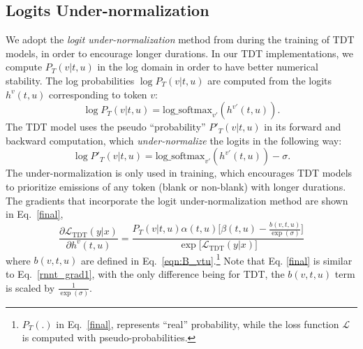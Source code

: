 \documentclass{article}
\begin{document}
\subsection{Logits Under-normalization} \label{sec:under_norm}
We adopt the \emph{logit under-normalization} method from \cite{xu2022multi} during the training of  TDT models, in order to encourage longer durations. 
In our TDT implementations, we compute $P_T(v|t, u)$  in the log domain in order to have better numerical stability. The log probabilities $\log P_T(v|t, u)$ are computed from the logits  $h^v(t,u)$ corresponding to token $v$:
\begin{equation}
    \log P_T(v|t, u) =
\text{log\_softmax}_{v'} (h^{v'}(t, u)).
\end{equation}
The TDT model uses the pseudo ``probability'' $P'_T(v|t,u)$  in its forward and backward computation, which \emph{under-normalize} the logits in the following way:
\begin{equation}
\label{logits}
\log P'_T(v|t, u) =
\text{log\_softmax}_{v'} (h^{v'}(t, u)) - \sigma.
\end{equation}
The under-normalization is only used in training, which encourages TDT models to prioritize emissions of any token (blank or non-blank) with longer durations. 
The gradients that incorporate the logit under-normalization method are shown in Eq.~\ref{final}, 
\begin{equation}
\label{final}
\frac{\partial \mathcal{L}_\text{TDT}(y|x)}{\partial h^v(t,u)} = \frac{P_T(v|t, u) \alpha(t,u) \Big[\beta(t, u) - \frac{b(v, t, u)}{\exp(\sigma)}\Big] }{\exp\Big[\mathcal{L}_\text{TDT}(y|x)\Big]} 
\end{equation}
where  $b(v, t, u)$ are defined in Eq.~\ref{eqn:B_vtu}.\footnote{$P_T(.)$  in  
Eq.~\ref{final}, represents ``real'' probability, while the loss function $\mathcal{L}$ is computed with pseudo-probabilities.}
Note that Eq. \ref{final} is similar to 
Eq.~\ref{rnnt_grad1}, with the only difference being for TDT, the $b(v, t, u)$ term is scaled by $\frac{1}{\exp(\sigma)}$. 
\end{document}
